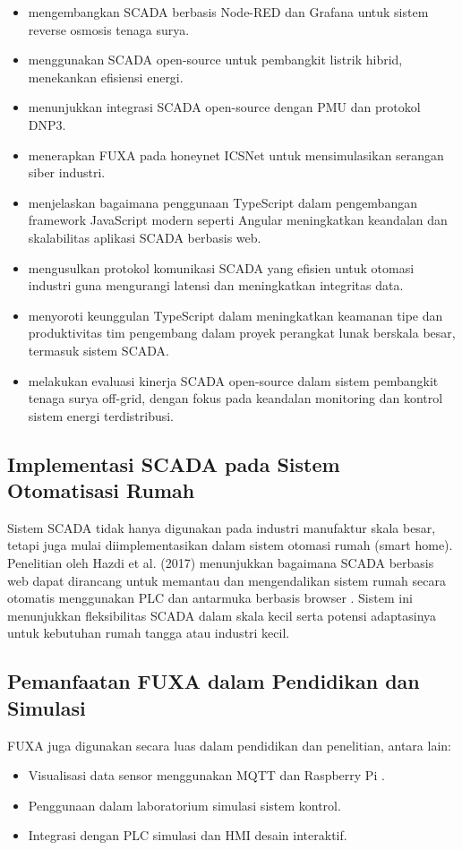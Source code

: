 \begin{itemize}
\item \textcite{uddin2022open} mengembangkan SCADA berbasis Node-RED dan Grafana untuk sistem reverse osmosis tenaga surya.
\item \textcite{omidi2023node} menggunakan SCADA open-source untuk pembangkit listrik hibrid, menekankan efisiensi energi.
\item \textcite{almas2014open} menunjukkan integrasi SCADA open-source dengan PMU dan protokol DNP3.
\item \textcite{rubiomedrano2023icsnet} menerapkan FUXA pada honeynet ICSNet untuk mensimulasikan serangan siber industri.
\item \textcite{emmanni2025typescript} menjelaskan bagaimana penggunaan TypeScript dalam pengembangan framework JavaScript modern seperti Angular meningkatkan keandalan dan skalabilitas aplikasi SCADA berbasis web.
\item \textcite{abbas2015efficient} mengusulkan protokol komunikasi SCADA yang efisien untuk otomasi industri guna mengurangi latensi dan meningkatkan integritas data.
\item \textcite{scarsbrook2023typescript} menyoroti keunggulan TypeScript dalam meningkatkan keamanan tipe dan produktivitas tim pengembang dalam proyek perangkat lunak berskala besar, termasuk sistem SCADA.
\item \textcite{eras_almeida2023off_grid_pv} melakukan evaluasi kinerja SCADA open-source dalam sistem pembangkit tenaga surya off-grid, dengan fokus pada keandalan monitoring dan kontrol sistem energi terdistribusi.
\end{itemize}
\subsection{Implementasi SCADA pada Sistem Otomatisasi Rumah}
Sistem SCADA tidak hanya digunakan pada industri manufaktur skala besar, tetapi juga mulai diimplementasikan dalam sistem otomasi rumah (smart home). Penelitian oleh Hazdi et al. (2017) menunjukkan bagaimana SCADA berbasis web dapat dirancang untuk memantau dan mengendalikan sistem rumah secara otomatis menggunakan PLC dan antarmuka berbasis browser \parencite{hazdi2017scada}. Sistem ini menunjukkan fleksibilitas SCADA dalam skala kecil serta potensi adaptasinya untuk kebutuhan rumah tangga atau industri kecil.

\subsection{Pemanfaatan FUXA dalam Pendidikan dan Simulasi}
FUXA juga digunakan secara luas dalam pendidikan dan penelitian, antara lain:

\begin{itemize}
    \item Visualisasi data sensor menggunakan MQTT dan Raspberry Pi \parencite{seeed2024fuxa}.
    \item Penggunaan dalam laboratorium simulasi sistem kontrol.
    \item Integrasi dengan PLC simulasi dan HMI desain interaktif.
\end{itemize}
